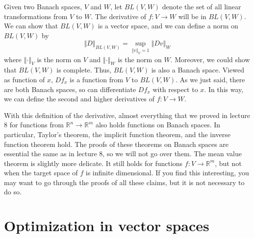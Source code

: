 \documentclass[12pt,reqno]{amsart}
\theoremstyle{definition}
\def\R{\mathbb{R}}
\newcommand{\norm}[1]{\left\Vert {#1} \right\Vert}
\renewcommand{\to}{{\rightarrow}}
\begin{document}
Given two Banach spaces, $V$ and $W$, let $BL(V,W)$ denote the set of
all linear transformations from $V$ to $W$. The derivative of
 $f:V \to
W$ will be in $BL(V,W)$. We can show that $BL(V,W)$ is a vector space,
and we can define a norm on $BL(V,W)$ by 
\[ \norm{D}_{BL(V,W)} = \sup_{\norm{v}_V=1} \norm{D v}_{W} \]
where $\norm{\cdot}_V$ is the norm on $V$ and $\norm{\cdot}_W$ is the
norm on $W$. Moreover, we could show that $BL(V,W)$ is complete. Thus,
$BL(V,W)$ is also a Banach space. Viewed as function of $x$, $Df_x$ is
a function from $V$ to $BL(V,W)$. As we just said, there are both
Banach spaces, so can differentiate $Df_x$ with respect to $x$. In 
this way, we can define the second and higher derivatives of $f:V \to
W$. 

With this definition of the derivative, almost everything that we
proved in lecture 8 for functions from $\R^n \to \R^m$ also holds
functions on Banach spaces. In particular, Taylor's theorem, the
implicit function theorem, and the inverse function theorem
hold. The proofs of these theorems on Banach spaces are essential the
same as in lecture 8, so we will not go over them. The mean value
theorem is slightly more delicate. It still holds for functions $f:V
\to \R^m$, 
but not when the target space of $f$ is infinite
dimensional. If you find this interesting, you may want to go through
the proofs of all these claims, but it is not necessary to do so.

\section{Optimization in vector spaces}
\end{document}
